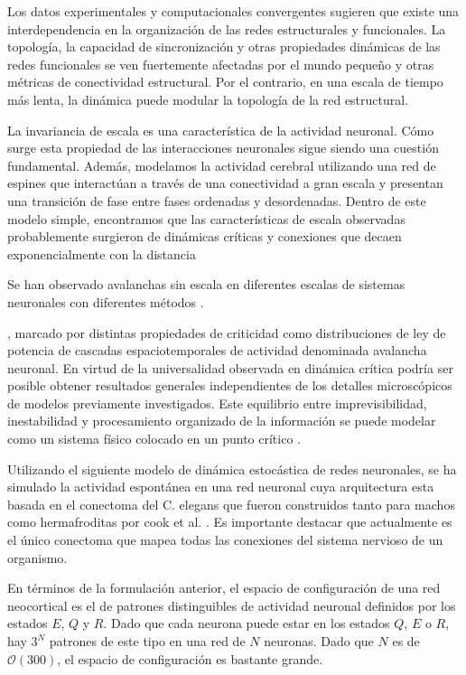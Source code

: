 Los datos experimentales y computacionales convergentes sugieren que existe una interdependencia en la organización de las redes estructurales y funcionales. La topología, la capacidad de sincronización y otras propiedades dinámicas de las redes funcionales se ven fuertemente afectadas por el mundo pequeño y otras métricas de conectividad estructural. Por el contrario, en una escala de tiempo más lenta, la dinámica puede modular la topología de la red estructural.



La invariancia de escala es una característica de la actividad neuronal. Cómo surge esta propiedad de las interacciones neuronales sigue siendo una cuestión fundamental.
Además, modelamos la actividad cerebral utilizando una red de espines que interactúan a través de una conectividad a gran escala y presentan una transición de fase entre fases ordenadas y desordenadas. Dentro de este modelo simple, encontramos que las características de escala observadas probablemente surgieron de dinámicas críticas y conexiones que decaen exponencialmente con la distancia


Se han observado avalanchas sin escala en diferentes escalas de sistemas neuronales con diferentes métodos \cite{zhou_optimal_2021}.


, marcado por distintas propiedades de criticidad como distribuciones de ley de potencia de cascadas espaciotemporales de actividad denominada avalancha neuronal.  
En virtud de la universalidad observada en dinámica crítica podría ser posible obtener resultados generales independientes de los detalles microscópicos de modelos previamente investigados.  Este equilibrio entre imprevisibilidad, inestabilidad y procesamiento organizado de la información se puede modelar como un sistema físico colocado en un punto crítico \cite{chialvo_emergent_2010}.

Utilizando el siguiente modelo  de dinámica estocástica de redes neuronales, se ha  simulado la actividad espontánea en una red neuronal cuya arquitectura esta basada en el conectoma del C. elegans   que fueron construidos tanto para machos como hermafroditas por cook et al. \cite{cook_whole-animal_2019}. Es importante destacar que actualmente es el único   conectoma  que mapea todas las conexiones del sistema nervioso de un organismo. 


En términos de la formulación anterior, el espacio de configuración de una red neocortical es el de patrones distinguibles de actividad neuronal definidos por los estados $E$, $Q$ y $R$. Dado que cada neurona puede estar en los estados $Q$, $E$ o $R$, hay $3^N$ patrones de este tipo en una red de $N$ neuronas. Dado que $N$ es de $\mathcal{O}(300)$, el espacio de configuración es bastante grande. 


